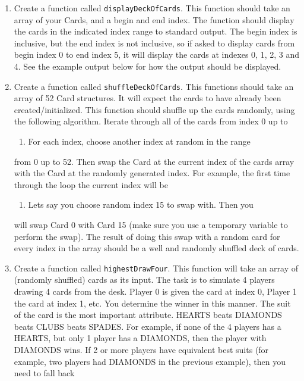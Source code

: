 \documentclass[11pt]{article}
\begin{document}
\begin{enumerate}
\item Create a function called \verb~displayDeckOfCards~.  This function
   should take an array of your Cards, and a begin and end index.  The
   function should display the cards in the indicated index range to
   standard output.  The begin index is inclusive, but the end index
   is not inclusive, so if asked to display cards from begin index 0
   to end index 5, it will display the cards at indexes 0, 1, 2, 3
   and 4.  See the example output below for how the output should be
   displayed.
\item Create a function called \verb~shuffleDeckOfCards~.  This functions
   should take an array of 52 Card structures.  It will expect
   the cards to have already been created/initialized.  This function
   should shuffle up the cards randomly, using the following
   algorithm.  Iterate through all of the cards from index 0 up to
\begin{enumerate}
\item For each index, choose another index at random in the range
\end{enumerate}
from 0 up to 52.  Then swap the Card at the current index of the
   cards array with the Card at the randomly generated index.  For
   example, the first time through the loop the current index will be
\begin{enumerate}
\item Lets say you choose random index 15 to swap with.  Then you
\end{enumerate}
will swap Card 0 with Card 15 (make sure you use a temporary
   variable to perform the swap).  The result of doing this swap with
   a random card for every index in the array should be a well and
   randomly shuffled deck of cards.
\item Create a function called \verb~highestDrawFour~.  This function will
   take an array of (randomly shuffled) cards as its input.  The
   task is to simulate 4 players drawing 4 cards from the desk.  
   Player 0 is given the card at index 0, Player 1 the card at
   index 1, etc.  You determine the winner in this manner.  The
   suit of the card is the most important attribute.  
   HEARTS beats DIAMONDS beats CLUBS beats SPADES.  For example,
   if none of the 4 players has a HEARTS, but only 1 player has
   a DIAMONDS, then the player with DIAMONDS wins.  If 2 or more
   players have equivalent best suits (for example, two players had
   DIAMONDS in the previous example), then you need to fall back

\end{enumerate}
\end{document}
